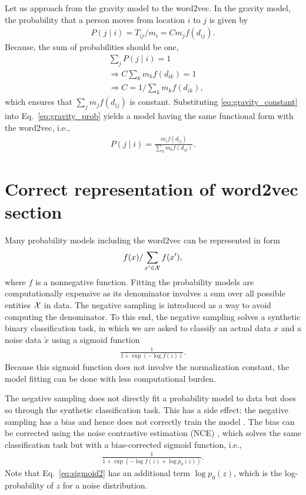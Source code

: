 \documentclass[12pt]{article} %
\def\given{\mid}
\def\ie{i.e.,~}
\begin{document}
Let us approach from the gravity model to the word2vec.
In the gravity model, the probability that a person moves from location $i$ to $j$ is given by
\begin{align}
    P\left(j \given i \right) = T_{ij} / m_i = C m_j f(d_{ij}). \label{eq:gravity_prob}
\end{align}
Because, the sum of probabilities should be one,
\begin{align}
     & \sum_{j} P(j \given i) = 1 \nonumber                                     \\
     & \Rightarrow C \sum_{k} m_k f(d_{ik}) = 1 \nonumber                       \\
     & \Rightarrow C  = 1 / \sum_{k} m_k f(d_{ik}), \label{eq:gravity_constant}
\end{align}
which ensures that $\sum_{j} m_j f(d_{ij})$ is constant.
Substituting \eqref{eq:gravity_constant}  into Eq.~\eqref{eq:gravity_prob} yields a model having the same functional form with the word2vec, \ie
\begin{align}
    P\left(j \given i \right) = \frac{m_i f(d_{ij})}{\sum_{k} m_k f(d_{ik})}. \label{eq:gravity_prob2}
\end{align}


\section{Correct representation of word2vec section}
\label{sec:correct_word2vec}

Many probability models including the word2vec can be represented in form
\begin{align}
    f(x) / \sum_{x' \in {\cal X}} f(x'),
\end{align}
where $f$ is a nonnegative function.
Fitting the probability models are computationally expensive as its denominator involves a sum over all possible entities ${\cal X}$ in data.
The negative sampling is introduced as a way to avoid computing the denominator.
To this end, the negative sampling solves a synthetic binary classification task, in which
we are asked to classify an actual data $x$ and a noise data $\tilde x$ using a sigmoid function
\begin{align}
    \label{eq:sigmoid}
    \frac{1}{1 + \exp\left( -\log f(z) \right)}.
\end{align}
Because this sigmoid function does not involve the normalization constant, the model fitting can be done with less computational burden.


The negative sampling does not directly fit a probability model to data but does so through the synthetic classification task.
This has a side effect: the negative sampling has a bias and hence does not correctly train the model \cite{Dyer2014}.
The bias can be corrected using the noise contrastive estimation (NCE) \cite{Chia2010}, which solves the
same classification task but with a bias-corrected sigmoid function, \ie
\begin{align}
    \label{eq:sigmoid2}
    \frac{1}{1 + \exp\left( -\log f(z) + \log p_0(z) \right)}.
\end{align}
Note that Eq.~\eqref{eq:sigmoid2} has an additional term $\log p_0(z)$, which is the log-probability of $z$ for a noise distribution.
\end{document}
